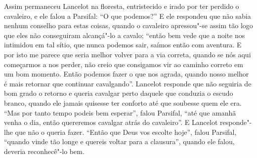 Assim permaneceu Lancelot na floresta, entristecido e irado por ter perdido o
cavaleiro, e ele falou a Parsifal: “O que podemos?” E ele respondeu que não
sabia nenhum conselho para estas coisas, quando o cavaleiro apressou"-se assim
tão logo que eles não conseguiram alcançá"-lo a cavalo; “então bem vede que a
noite nos intimidou em tal sítio, que nunca podemos sair, saímos então com
aventura. E por isto me parece que seria melhor volver para a via correta,
quando se nós aqui começarmos a nos perder, não creio que consigamos vir ao
caminho correto em um bom momento. Então podemos fazer o que nos agrada, quando
nosso melhor é mais retornar que continuar cavalgando”. Lancelot responde que
não seguiria de bom grado o retorno e queria cavalgar perto daquele que
conduzia o escudo branco, quando ele jamais quisesse ter conforto até que
soubesse quem ele era. “Mas por tanto tempo podeis bem esperar”, falou
Parsifal, “até que amanhã venha o dia, então quereremos cavalgar atrás do
cavaleiro”. E Lancelot responde"-lhe que não o queria fazer. “Então que Deus
vos escolte hoje”, falou Parsifal, “quando vinde tão longe e quereis voltar
para a clausura”, quando ele falou, deveria reconhecê"-lo bem. 

